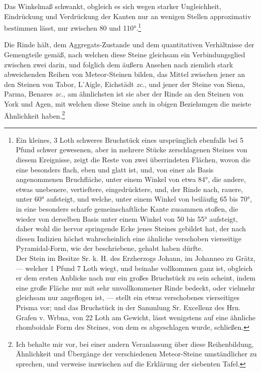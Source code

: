 \documentclass[a4paper, 11pt, oneside, german]{article}
\begin{document}
Das Winkelmaß schwankt, obgleich es sich wegen starker Ungleichheit, Eindrückung und Verdrückung der Kanten nur an wenigen Stellen approximativ bestimmen lässt, nur zwischen 80 und 110°.\footnote{Ein kleines, 3 Loth schweres Bruchstück eines ursprünglich ebenfalls bei 5 Pfund schwer gewesenen, aber in mehrere Stücke zerschlagenen Steines von diesem Ereignisse, zeigt die Reste von zwei überrindeten Flächen, wovon die eine besonders flach, eben und glatt ist, und, von einer als Basis angenommenen Bruchfläche, unter einem Winkel von etwa 84°, die andere, etwas unebenere, vertieftere, eingedrücktere, und, der Rinde nach, rauere, unter 60° aufsteigt, und welche, unter einem Winkel von beiläufig 65 bis 70°, in eine besonders scharfe gemeinschaftliche Kante zusammen stoßen, die wieder von derselben Basis unter einem Winkel von 50 bis 55° aufsteigt, daher wohl die hervor springende Ecke jenes Steines gebildet hat, der nach diesen Indizien höchst wahrscheinlich eine ähnliche verschoben vierseitige Pyramidal-Form, wie der beschriebene, gehabt haben dürfte.\\
Der Stein im Besitze Sr. k. H. des Erzherzogs Johann, im Johanneo zu Grätz, --- welcher 1 Pfund 7 Loth wiegt, und beinahe vollkommen ganz ist, obgleich er dem ersten Anblicke nach nur ein großes Bruchstück zu sein scheint, indem eine große Fläche nur mit sehr unvollkommener Rinde bedeckt, oder vielmehr gleichsam nur angeflogen ist, --- stellt ein etwas verschobenes vierseitiges Prisma vor; und das Bruchstück in der Sammlung Sr. Excellenz des Hrn. Grafen v. Wrbna, von 22 Loth am Gewicht, lässt wenigstens auf eine ähnliche rhomboidale Form des Steines, von dem es abgeschlagen wurde, schließen.}

Die Rinde hält, dem Aggregats-Zustande und dem quantitativen Verhältnisse der Gemengteile gemäß, nach welchen diese Steine gleichsam ein Verbindungsglied zwischen zwei darin, und folglich dem äußern Ansehen nach ziemlich stark abweichenden Reihen von Meteor-Steinen bilden, das Mittel zwischen jener an den Steinen von Tabor, L'Aigle, Eichstädt \emph{zc.}, und jener der Steine von Siena, Parma, Benares \emph{zc.}, am ähnlichsten ist sie aber der Rinde an den Steinen von York und Agen, mit welchen diese Steine auch in obigen Beziehungen die meiste Ähnlichkeit haben.\footnote{Ich behalte mir vor, bei einer andern Veranlassung über diese Reihenbildung, Ähnlichkeit und Übergänge der verschiedenen Meteor-Steine umständlicher zu sprechen, und verweise inzwischen auf die Erklärung der siebenten Tafel.}
\end{document}
